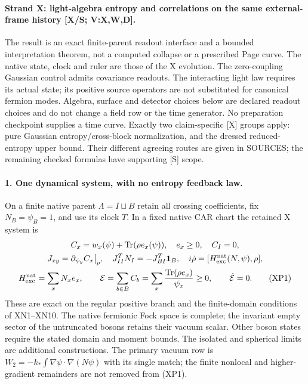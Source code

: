 \documentclass[11pt]{article}
\DeclareMathOperator{\Tr}{Tr}
\begin{document}
\paragraph{Strand X: light-algebra entropy and correlations on the
same external-frame history [X/S; V:X,W,D].}
The result is an exact finite-parent readout interface and a bounded
interpretation theorem, not a computed collapse or a prescribed Page
curve.  The native state, clock and ruler are those of the X evolution.
The zero-coupling Gaussian control admits covariance readouts.  The
interacting light law requires its actual state; its positive source
operators are not substituted for canonical fermion modes.
Algebra, surface and detector choices below are declared readout
choices and do not change a field row or the time generator.
No preparation checkpoint supplies a time curve.
Exactly two claim-specific [X] groups apply: pure Gaussian
entropy/cross-block normalization, and the dressed reduced-entropy
upper bound.  Their different agreeing routes are given in SOURCES;
the remaining checked formulas have supporting [S] scope.

\paragraph{1. One dynamical system, with no entropy feedback law.}
On a finite native parent $\Lambda=I\sqcup B$ retain all crossing
coefficients, fix $N_B=\psi_B=1$, and use its clock $T$.  In a fixed
native CAR chart the retained X system is
\begin{equation}
\begin{gathered}
 C_x=w_x(\psi)+\Tr(\rho e_x(\psi)),\quad e_x\geq0,\quad C_I=0,\\
 J_{xy}=\partial_{\psi_y}C_x\big|_\rho,\quad
 J_{II}^{T}N_I=-J_{BI}^{T}{\bf1}_B,\quad
 i\dot\rho=[H_{\rm exc}^{\rm nat}(N,\psi),\rho],\\
 H_{\rm exc}^{\rm nat}=\sum_xN_xe_x,\qquad
 {\cal E}=\sum_{b\in B}C_b
          =\sum_x\frac{\Tr(\rho e_x)}{\psi_x}\geq0,\qquad
 \dot{\cal E}=0 .
 \tag{XP1}
\end{gathered}
\end{equation}
These are exact on the regular positive branch and the finite-domain
conditions of XN1--XN10.  The native fermionic Fock space is complete;
the invariant empty sector of the untruncated bosons retains their
vacuum scalar.  Other boson states require the stated domain and
moment bounds.  The isolated and spherical limits are additional
constructions.  The primary vacuum row is
$W_2=-k_*\int\nabla\psi\cdot\nabla(N\psi)$ with its single match;
the finite nonlocal and higher-gradient remainders are not removed
from (XP1).
\end{document}
